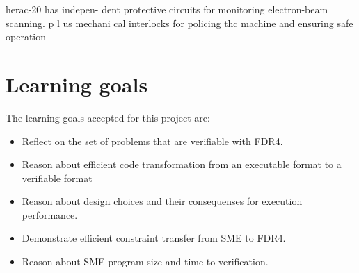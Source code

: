 \documentclass[a4paper]{report}
\begin{document}
herac-20 has indepen-
dent protective circuits for monitoring
electron-beam scanning. p l us mechani­
cal interlocks for policing thc machine
and ensuring safe operation
\section{Learning goals}
The learning goals accepted for this project are:
\begin{itemize}
\item Reflect on the set of problems that are verifiable with FDR4.
\item Reason about efficient code transformation from an executable format to a verifiable format
\item Reason about design choices and their consequenses for execution performance.
\item Demonstrate efficient constraint transfer from SME to FDR4.
\item Reason about SME program size and time to verification. 
\end{itemize}
\end{document}
